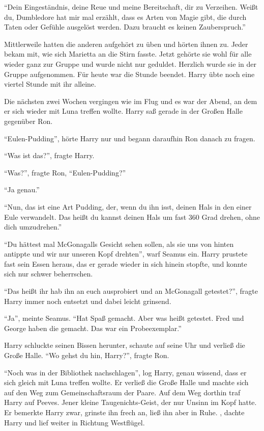 \enquote{Dein Eingeständnis, deine Reue und meine Bereitschaft, dir zu Verzeihen. \gst Weißt du, Dumbledore hat mir mal erzählt, dass es Arten von Magie gibt, die durch Taten oder Gefühle ausgelöst werden. Dazu braucht es keinen Zauberspruch.}

Mittlerweile hatten die anderen aufgehört zu üben und hörten ihnen zu. Jeder bekam mit, wie sich Marietta an die Stirn fasste. Jetzt gehörte sie wohl für alle wieder ganz zur Gruppe und wurde nicht nur geduldet. Herzlich wurde sie in der Gruppe aufgenommen. Für heute war die Stunde beendet. Harry übte noch eine viertel Stunde mit ihr alleine.

Die nächsten zwei Wochen vergingen wie im Flug und es war der Abend, an dem er sich wieder mit Luna treffen wollte. Harry saß gerade in der Großen Halle gegenüber Ron.

\enquote{Eulen-Pudding}, hörte Harry nur und begann daraufhin Ron danach zu fragen.

\enquote{Was ist das?}, fragte Harry.

\enquote{Was?}, fragte Ron, \enquote{Eulen-Pudding?}

\enquote{Ja genau.}

\enquote{Nun, das ist eine Art Pudding, der, wenn du ihn isst, deinen Hals in den einer Eule verwandelt. Das heißt du kannst deinen Hals um fast 360 Grad drehen, ohne dich umzudrehen.}

\enquote{Du hättest mal McGonagalls Gesicht sehen sollen, als sie uns von hinten antippte und wir nur unseren Kopf drehten}, warf Seamus ein. Harry prustete fast sein Essen heraus, das er gerade wieder in sich hinein stopfte, und konnte sich nur schwer beherrschen.

\enquote{Das heißt ihr hab ihn an euch ausprobiert und an McGonagall getestet?}, fragte Harry immer noch entsetzt und dabei leicht grinsend.

\enquote{Ja}, meinte Seamus. \enquote{Hat Spaß gemacht. Aber was heißt getestet. Fred und George haben die gemacht. Das war ein Probeexemplar.}

Harry schluckte seinen Bissen herunter, schaute auf seine Uhr und verließ die Große Halle. \enquote{Wo gehst du hin, Harry?}, fragte Ron.

\enquote{Noch was in der Bibliothek nachschlagen}, log Harry, genau wissend, dass er sich gleich mit Luna treffen wollte. Er verließ die Große Halle und machte sich auf den Weg zum Gemeinschaftsraum der Paare. Auf dem Weg dorthin traf Harry auf Peeves. Jener kleine Taugenichts-Geist, der nur Unsinn im Kopf hatte. Er bemerkte Harry zwar, grinste ihn frech an, ließ ihn aber in Ruhe. , dachte Harry und lief weiter in Richtung Westflügel.

